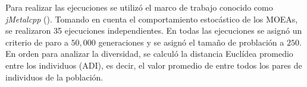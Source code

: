 Para realizar las ejecuciones se utilizó el marco de trabajo conocido como \textit{jMetalcpp} (\cite{Joel:jMetal}).
%
Tomando en cuenta el comportamiento estocástico de los MOEAs, se realizaron 35 ejecuciones independientes.
%
En todas las ejecuciones se asignó un criterio de paro a $50,000$ generaciones y se asignó el tamaño de problación a $250$.
%
En orden para analizar la diversidad, se calculó la distancia Euclídea promedio entre los individuos (ADI), es decir, el valor promedio de entre todos los pares de individuos de la población.

